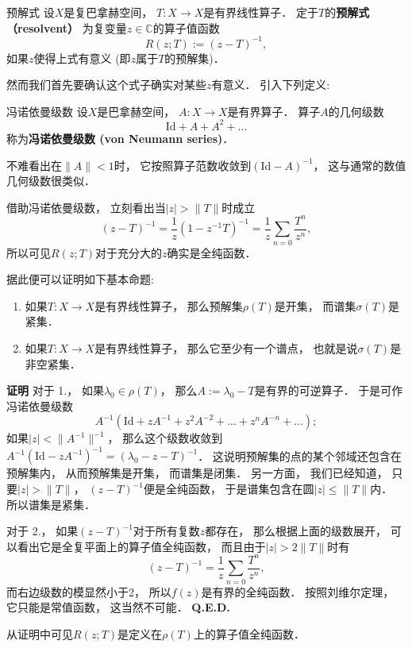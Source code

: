 

\begin{definition}{预解式}
设$X$是复巴拿赫空间， $T:X\to X$是有界线性算子． 定于$T$的\textbf{预解式（resolvent）} 为复变量$z\in\mathbb{C}$的算子值函数
$$
R(z;T):=(z-T)^{-1},
$$
如果$z$使得上式有意义 (即$z$属于$T$的预解集)．
\end{definition}

然而我们首先要确认这个式子确实对某些$z$有意义． 引入下列定义:

\begin{definition}{冯诺依曼级数}
设$X$是巴拿赫空间， $A:X\to X$是有界算子． 算子$A$的几何级数
$$
\text{Id}+A+A^2+\dots
$$
称为\textbf{冯诺依曼级数 (von Neumann series)}．
\end{definition}
不难看出在$\|A\|<1$时， 它按照算子范数收敛到$(\text{Id}-A)^{-1}$， 这与通常的数值几何级数很类似． 

借助冯诺依曼级数， 立刻看出当$|z|>\|T\|$时成立
$$
(z-T)^{-1}
=\frac{1}{z}(1-z^{-1}T)^{-1}
=\frac{1}{z}\sum_{n=0}\frac{T^n}{z^n},
$$
所以可见$R(z;T)$对于充分大的$z$确实是全纯函数．

据此便可以证明如下基本命题:

\begin{theorem}{}
\begin{enumerate}
\item 如果$T:X\to X$是有界线性算子， 那么预解集$\rho(T)$是开集， 而谱集$\sigma(T)$是紧集．
\item 如果$T:X\to X$是有界线性算子， 那么它至少有一个谱点， 也就是说$\sigma(T)$是非空紧集．
\end{enumerate}
\end{theorem}
\textbf{证明} 
对于 1.， 如果$\lambda_0\in\rho(T)$， 那么$A:=\lambda_0-T$是有界的可逆算子． 于是可作冯诺依曼级数
$$
A^{-1}(\text{Id}+zA^{-1}+z^2A^{-2}+\dots+z^nA^{-n}+\dots);
$$
如果$|z|<\|A^{-1}\|^{-1}$， 那么这个级数收敛到 $A^{-1}(\text{Id}-zA^{-1})^{-1}=(\lambda_0-z-T)^{-1}$． 这说明预解集的点的某个邻域还包含在预解集内， 从而预解集是开集， 而谱集是闭集． 另一方面， 我们已经知道， 只要$|z|>\|T\|$， $(z-T)^{-1}$便是全纯函数， 于是谱集包含在圆$|z|\leq\|T\|$内． 所以谱集是紧集．

对于 2.， 如果$(z-T)^{-1}$对于所有复数$z$都存在， 那么根据上面的级数展开， 可以看出它是全复平面上的算子值全纯函数， 而且由于$|z|>2\|T\|$时有
$$
(z-T)^{-1}=\frac{1}{z}\sum_{n=0}\frac{T^n}{z^n},
$$
而右边级数的模显然小于2， 所以$f(z)$是有界的全纯函数． 按照刘维尔定理， 它只能是常值函数， 这当然不可能． \textbf{Q.E.D.}

从证明中可见$R(z;T)$是定义在$\rho(T)$上的算子值全纯函数．